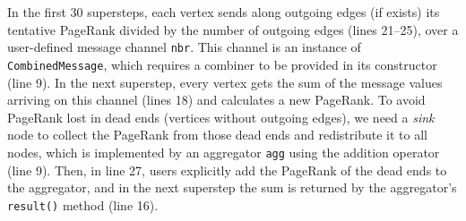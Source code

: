 \documentclass{sokendai_thesis} %
\begin{document}
In the first 30 supersteps, each vertex sends along outgoing edges (if exists) its tentative PageRank divided by the number of outgoing edges (lines 21--25), over a user-defined message channel \texttt{nbr}.
This channel is an instance of \texttt{CombinedMessage}, which requires a combiner to be provided in its constructor (line 9).
In the next superstep, every vertex gets the sum of the message values arriving on this channel (lines 18) and calculates a new PageRank.
To avoid PageRank lost in dead ends (vertices without outgoing edges), we need a \textit{sink} node to collect the PageRank from those dead ends and redistribute it to all nodes, which is implemented by an aggregator \texttt{agg} using the addition operator (line 9).
Then, in line 27, users explicitly add the PageRank of the dead ends to the aggregator, and in the next superstep the sum is returned by the aggregator's \texttt{result()} method (line 16).

\end{document}
